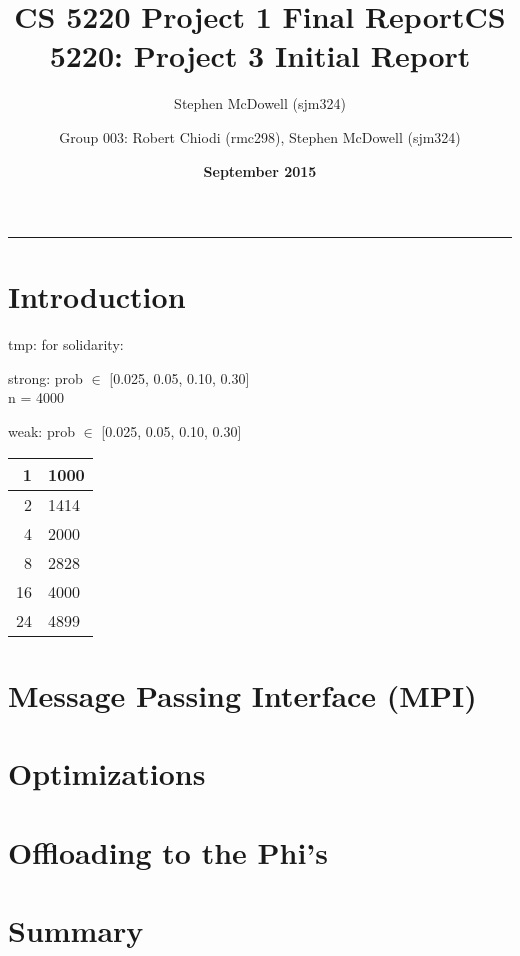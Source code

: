 \documentclass[11pt]{article}
\title{\textbf{CS 5220 Project 1 Final Report}}
\author{Stephen McDowell (sjm324)}
\date{\textbf{September 2015}}
\title{CS 5220: Project 3 Initial Report}
\author{Group 003: Robert Chiodi (rmc298), Stephen McDowell (sjm324)}
\makeatletter
\renewcommand{\maketitle}{\bgroup\setlength{\parindent}{0pt}
\begin{flushleft}
  {\Large \textsc{\@title}}\newline
  \textsc{\@author}
  \rule{\textwidth}{1pt}
\end{flushleft}\egroup
}
\makeatother
\begin{document}
\thispagestyle{empty}
\maketitle

\section{Introduction}

tmp: for solidarity:

strong:
prob $\in$ [0.025, 0.05, 0.10, 0.30]\\
n = 4000

weak:
prob $\in$ [0.025, 0.05, 0.10, 0.30]\\
\begin{tabular}{|r|l|}
	\hline
	1 & 1000\\ \hline
	2 & 1414\\ \hline
	4 & 2000\\ \hline
	8 & 2828\\ \hline
	16 & 4000\\ \hline
	24 & 4899\\ \hline
\end{tabular}

\section{Message Passing Interface (MPI)}

\section{Optimizations}

\section{Offloading to the Phi's}

\section{Summary}
\end{document}
